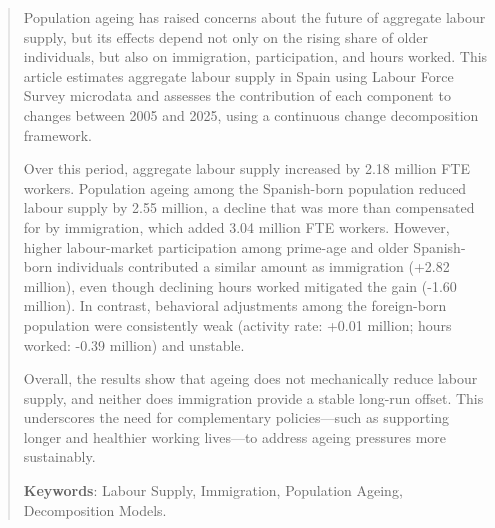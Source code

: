 \begin{abstract}

Population ageing has raised concerns about the future of aggregate labour supply, but its effects depend not only on the rising share of older individuals, but also on immigration, participation, and hours worked. This article estimates aggregate labour supply in Spain using Labour Force Survey microdata and assesses the contribution of each component to changes between 2005 and 2025, using a continuous change decomposition framework. 

\vspace{0.7em}\par
Over this period, aggregate labour supply increased by 2.18 million FTE workers. Population ageing among the Spanish-born population reduced labour supply by 2.55 million, a decline that was more than compensated for by immigration, which added 3.04 million FTE workers. However, higher labour-market participation among prime-age and older Spanish-born individuals contributed a similar amount as immigration (+2.82 million), even though declining hours worked mitigated the gain (-1.60 million). In contrast, behavioral adjustments among the foreign-born population were consistently weak (activity rate: +0.01 million; hours worked: -0.39 million) and unstable.

\vspace{0.7em}\par
Overall, the results show that ageing does not mechanically reduce labour supply, and neither does immigration provide a stable long-run offset. This underscores the need for complementary policies—such as supporting longer and healthier working lives—to address ageing pressures more sustainably.



\vspace{0.7em}\par
\textbf{Keywords}: Labour Supply, Immigration, Population Ageing, Decomposition Models.
\end{abstract}
